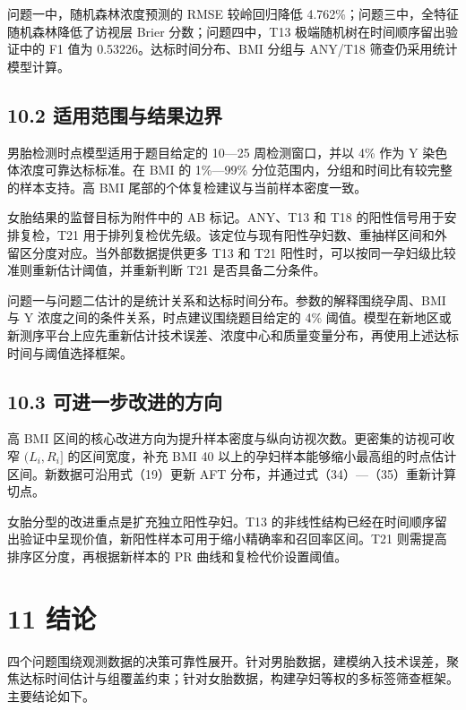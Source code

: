 \documentclass[UTF8,fontset=fandol,zihao=-4,a4paper]{ctexart}
\begin{document}
问题一中，随机森林浓度预测的 RMSE 较岭回归降低 4.762\%；问题三中，全特征随机森林降低了访视层 Brier
分数；问题四中，T13 极端随机树在时间顺序留出验证中的 F1
值为 0.53226。达标时间分布、BMI 分组与 ANY/T18
筛查仍采用统计模型计算。

\subsection{10.2
适用范围与结果边界}\label{ux9002ux7528ux8303ux56f4ux4e0eux7ed3ux679cux8fb9ux754c}

男胎检测时点模型适用于题目给定的 10---25 周检测窗口，并以 4\% 作为 Y
染色体浓度可靠达标标准。在 BMI 的 1\%---99\%
分位范围内，分组和时间比有较完整的样本支持。高 BMI
尾部的个体复检建议与当前样本密度一致。

女胎结果的监督目标为附件中的 AB 标记。ANY、T13 和 T18
的阳性信号用于安排复检，T21
用于排列复检优先级。该定位与现有阳性孕妇数、重抽样区间和外留区分度对应。当外部数据提供更多
T13 和 T21 阳性时，可以按同一孕妇级比较准则重新估计阈值，并重新判断 T21
是否具备二分条件。

问题一与问题二估计的是统计关系和达标时间分布。参数的解释围绕孕周、BMI 与
Y 浓度之间的条件关系，时点建议围绕题目给定的 4\%
阈值。模型在新地区或新测序平台上应先重新估计技术误差、浓度中心和质量变量分布，再使用上述达标时间与阈值选择框架。

\subsection{10.3
可进一步改进的方向}\label{ux53efux8fdbux4e00ux6b65ux6539ux8fdbux7684ux65b9ux5411}

高 BMI 区间的核心改进方向为提升样本密度与纵向访视次数。更密集的访视可收窄
\((L_i,R_i]\) 的区间宽度，补充 BMI 40
以上的孕妇样本能够缩小最高组的时点估计区间。新数据可沿用式（19）更新 AFT
分布，并通过式（34）---（35）重新计算切点。

女胎分型的改进重点是扩充独立阳性孕妇。T13
的非线性结构已经在时间顺序留出验证中呈现价值，新阳性样本可用于缩小精确率和召回率区间。T21
则需提高排序区分度，再根据新样本的 PR 曲线和复检代价设置阈值。

\section{11 结论}\label{ux7ed3ux8bba}

四个问题围绕观测数据的决策可靠性展开。针对男胎数据，建模纳入技术误差，聚焦达标时间估计与组覆盖约束；针对女胎数据，构建孕妇等权的多标签筛查框架。主要结论如下。
\end{document}
